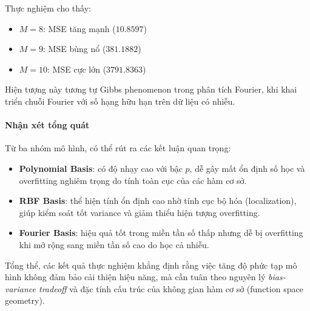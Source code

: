 Thực nghiệm cho thấy:
\begin{itemize}
    \item $M=8$: MSE tăng mạnh ($10.8597$)
    \item $M=9$: MSE bùng nổ ($381.1882$)
    \item $M=10$: MSE cực lớn ($3791.8363$)
\end{itemize}

Hiện tượng này tương tự Gibbs phenomenon trong phân tích Fourier,
khi khai triển chuỗi Fourier với số hạng hữu hạn trên dữ liệu có nhiễu.

\paragraph{Nhận xét tổng quát}

Từ ba nhóm mô hình, có thể rút ra các kết luận quan trọng:

\begin{itemize}
    \item \textbf{Polynomial Basis}: có độ nhạy cao với bậc $p$, dễ gây mất ổn định số học
    và overfitting nghiêm trọng do tính toàn cục của các hàm cơ sở.

    \item \textbf{RBF Basis}: thể hiện tính ổn định cao nhờ tính cục bộ hóa (localization),
    giúp kiểm soát tốt variance và giảm thiểu hiện tượng overfitting.

    \item \textbf{Fourier Basis}: hiệu quả tốt trong miền tần số thấp nhưng dễ bị
    overfitting khi mở rộng sang miền tần số cao do học cả nhiễu.
\end{itemize}

Tổng thể, các kết quả thực nghiệm khẳng định rằng việc tăng độ phức tạp mô hình
không đảm bảo cải thiện hiệu năng, mà cần tuân theo nguyên lý \textit{bias-variance tradeoff}
và đặc tính cấu trúc của không gian hàm cơ sở (function space geometry).